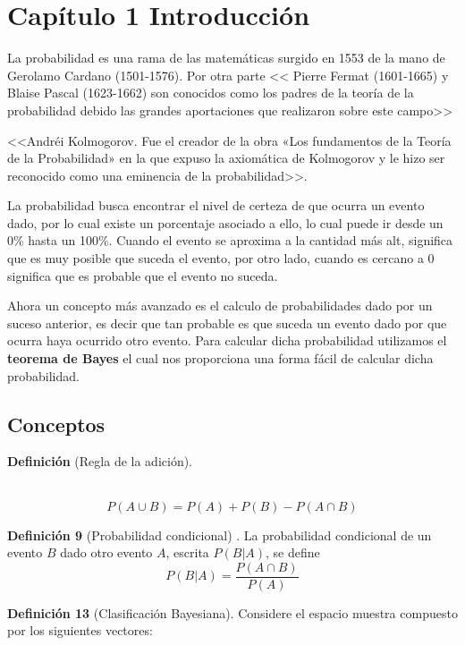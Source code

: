 \documentclass[
  spanish,
]{article}
\begin{document}
\hypertarget{capuxedtulo-1-introducciuxf3n}{%
\section{Capítulo 1 Introducción}\label{capuxedtulo-1-introducciuxf3n}}

La probabilidad es una rama de las matemáticas surgido en 1553 de la
mano de Gerolamo Cardano (1501-1576). Por otra parte
\textless\textless{} Pierre Fermat (1601-1665) y Blaise Pascal
(1623-1662) son conocidos como los padres de la teoría de la
probabilidad debido las grandes aportaciones que realizaron sobre este
campo\textgreater\textgreater{}

\textless\textless Andréi Kolmogorov. Fue el creador de la obra «Los
fundamentos de la Teoría de la Probabilidad» en la que expuso la
axiomática de Kolmogorov y le hizo ser reconocido como una eminencia de
la probabilidad\textgreater\textgreater.

La probabilidad busca encontrar el nivel de certeza de que ocurra un
evento dado, por lo cual existe un porcentaje asociado a ello, lo cual
puede ir desde un 0\% hasta un 100\%. Cuando el evento se aproxima a la
cantidad más alt, significa que es muy posible que suceda el evento, por
otro lado, cuando es cercano a 0 significa que es probable que el evento
no suceda.

Ahora un concepto más avanzado es el calculo de probabilidades dado por
un suceso anterior, es decir que tan probable es que suceda un evento
dado por que ocurra haya ocurrido otro evento. Para calcular dicha
probabilidad utilizamos el \textbf{teorema de Bayes} el cual nos
proporciona una forma fácil de calcular dicha probabilidad.

\hypertarget{conceptos}{%
\subsection{Conceptos}\label{conceptos}}

\textbf{Definición} (Regla de la adición).

\hspace{0pt}\\
\[
P(A \cup B) = P(A) + P(B) - P(A \cap B)
\]

\textbf{Definición 9 }(Probabilidad condicional) . La probabilidad
condicional de un evento \(B\) dado otro evento \(A\), escrita
\(P(B|A)\), se define \[
P(B|A)=\frac{P (A\cap B)}{P(A)}
\]

\textbf{Definición 13} (Clasificación Bayesiana). Considere el espacio
muestra compuesto por los siguientes vectores:
\end{document}
